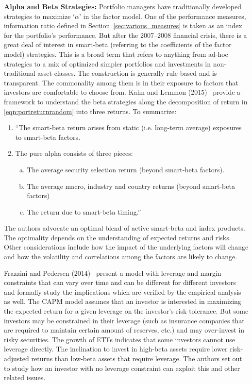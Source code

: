 \noindent\textbf{Alpha and Beta Strategies:} Portfolio managers have traditionally developed strategies to maximize `$\alpha$' in the factor model. One of the performance measures, information ratio defined in Section~\ref{sec:various_measures} is taken as an index for the portfolio's performance. But after the 2007--2008 financial crisis, there is a great deal of interest in smart-beta (referring to the coefficients of the factor model) strategies. This is a broad term that refers to anything from ad-hoc strategies to a mix of optimized simpler portfolios and investments in non-traditional asset classes. The construction is generally rule-based and is transparent. The commonality among them is in their exposure to factors that investors are comfortable to choose from. Kahn and Lemmon (2015)~\cite{lemmon} provide a framework to understand the beta strategies along the decomposition of return in \eqref{eqn:portreturnrandom} into three returns. To summarize:
	\begin{enumerate}[--]
	\item ``The smart-beta return arises from static (i.e. long-term average) exposures to smart-beta factors.
	\item The pure alpha consists of three pieces:
		\begin{enumerate}[a.]
		\item The average security selection return (beyond smart-beta factors).
		\item The average macro, industry and country returns (beyond smart-beta factors)
		\item The return due to smart-beta timing.''
		\end{enumerate}
	\end{enumerate}
The authors advocate an optimal blend of active smart-beta and index products. The optimality depends on the understanding of expected returns and risks. Other considerations include how the impact of the underlying factors will change and how the volatility and correlations among the factors are likely to change. 


Frazzini and Pedersen (2014)~\cite{frazped} present a model with leverage and margin constraints that can vary over time and can be different for different investors and formally study the implications which are verified by the empirical analysis as well. The CAPM model assumes that an investor is interested in maximizing the expected return for a given leverage on the investor's risk tolerance. But some investors may be constrained in their leverage (such as insurance companies that are required to maintain certain amount of reserves, etc.) and may over-invest in risky securities. The growth of ETFs indicates that some investors cannot use leverage directly. The inclination to invest in high-beta assets require lower risk-adjusted returns than low-beta assets that require leverage. The authors set out to study how an investor with no leverage constraint can exploit this and other related issues. 


